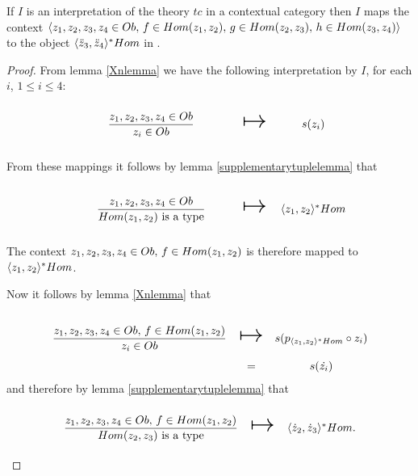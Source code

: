 \begin{lemma}
If $I$ is an interpretation of the theory $tc$ in a contextual category \catcw then
$I$ maps the context $\langle z_1,z_2,z_3,z_4 \in Ob,\,f \in Hom(z_1,z_2),\,g \in Hom(z_2,z_3),\,h \in Hom(z_3,z_4)\rangle$ to the object $\langle\ddot z_3,\ddot z_4\rangle^*Hom$ in \catc.
\end{lemma}
\begin{proof}
\newcommand {\forceSOURCEwidth}{\rule{5cm}{0pt}}  %
\newcommand {\forceTARGETwidth}{\rule{2.2cm}{0pt}}

From lemma \ref{Xnlemma} we have the following interpretation by $I$, for each $i$, $1 \leq i \leq 4$:
\begin{equation*}
\begin{array}{c c c}
\forceSOURCEwidth & & \forceTARGETwidth \\ [-0.1cm]
\gatdisplayrule{\zOOOO}{\ofT{z_i}{Ob}} & \Imapsto & s(z_i) 
\end{array}
\end{equation*}

From these mappings it follows by lemma \ref{supplementarytuplelemma} that 

\begin{equation*}
\begin{array}{c c c}
\forceSOURCEwidth & & \forceTARGETwidth \\ [-0.1cm]
\gatdisplayrule{\zOOOO}{\isT{Hom(z_1,z_2)}} & \Imapsto & \associativitypremisepoppopmapped 
\end{array}
\end{equation*}

The context $z_1,z_2,z_3,z_4 \in Ob,\,f \in Hom(z_1,z_2)$ is therefore mapped to $\langle z_1,z_2\rangle^*Hom$.

Now it follows by lemma \ref{Xnlemma} that 

\begin{equation*}
\begin{array}{c c c}
\forceSOURCEwidth & & \forceTARGETwidth \\ [-0.1cm]
\gatdisplayrule{\associativitypremisepoppop}{\ofT{z_i}{Ob}} & \Imapsto & s(p_{\associativitypremisepoppopmapped} \circ z_i) \\
                                                            & = & s(\dot{z_i})
\end{array}
\end{equation*}
and therefore by  lemma \ref{supplementarytuplelemma} that 
\begin{equation*}
\begin{array}{c c c}
\forceSOURCEwidth & & \forceTARGETwidth \\ [-0.1cm]
\gatdisplayrule{\associativitypremisepoppop}{\isT{Hom(z_2,z_3)}} & \Imapsto & \associativitypremisepopmapped.
\end{array}
\end{equation*}


\end{proof}
